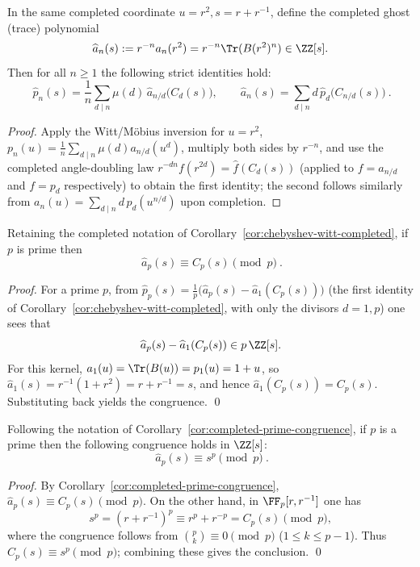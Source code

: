 \begin{corollary}\label{cor:chebyshev-witt-completed}
In the same completed coordinate \(u=r^2,s=r+r^{-1}\), define the completed ghost (trace) polynomial
\[
\widehat a_n(s):=r^{-n}a_n(r^2)=r^{-n}\Tr(B(r^2)^n)\in\ZZ[s].
\]
Then for all \(n\ge 1\) the following strict identities hold:
\[
\boxed{\
\widehat p_n(s)=\frac1n\sum_{d\mid n}\mu(d)\,\widehat a_{n/d}\!\bigl(C_d(s)\bigr),
\qquad
\widehat a_n(s)=\sum_{d\mid n}d\,\widehat p_d\!\bigl(C_{n/d}(s)\bigr)
\ }.
\]
\end{corollary}
\begin{proof}
Apply the Witt/M\"obius inversion for \(u=r^2\),
\(
p_n(u)=\frac1n\sum_{d\mid n}\mu(d)a_{n/d}(u^d)
\),
multiply both sides by \(r^{-n}\), and use the completed angle-doubling law
\(
r^{-dn}f(r^{2d})=\widehat f(C_d(s))
\)
(applied to \(f=a_{n/d}\) and \(f=p_d\) respectively) to obtain the first identity; the second follows similarly from
\(
a_n(u)=\sum_{d\mid n} d\,p_d(u^{n/d})
\)
upon completion.
\end{proof}

\begin{corollary}\label{cor:completed-prime-congruence}
Retaining the completed notation of Corollary~\ref{cor:chebyshev-witt-completed}, if \(p\) is prime then
\[
\boxed{\ \widehat a_p(s)\equiv C_p(s)\pmod p\ }.
\]
\end{corollary}
\begin{proof}
For a prime \(p\), from \(\widehat p_p(s)=\frac1p\bigl(\widehat a_p(s)-\widehat a_1(C_p(s))\bigr)\) (the first identity of Corollary~\ref{cor:chebyshev-witt-completed}, with only the divisors \(d=1,p\)) one sees that
\[
\widehat a_p(s)-\widehat a_1(C_p(s))\in p\,\ZZ[s].
\]
For this kernel, \(a_1(u)=\Tr(B(u))=p_1(u)=1+u\), so
\(
\widehat a_1(s)=r^{-1}(1+r^2)=r+r^{-1}=s
\), and hence \(\widehat a_1(C_p(s))=C_p(s)\).
Substituting back yields the congruence. \qed
\end{proof}

\begin{corollary}\label{cor:completed-teichmueller-congruence}
Following the notation of Corollary~\ref{cor:completed-prime-congruence}, if \(p\) is a prime then the following congruence holds in \(\ZZ[s]\):
\[
\boxed{\ \widehat a_p(s)\equiv s^p\pmod p\ }.
\]
\end{corollary}
\begin{proof}
By Corollary~\ref{cor:completed-prime-congruence}, \(\widehat a_p(s)\equiv C_p(s)\pmod p\).
On the other hand, in \(\FF_p[r,r^{-1}]\) one has
\[
s^p=(r+r^{-1})^p\equiv r^p+r^{-p}=C_p(s)\pmod p,
\]
where the congruence follows from \(\binom{p}{k}\equiv 0\pmod p\) (\(1\le k\le p-1\)).
Thus \(C_p(s)\equiv s^p\pmod p\); combining these gives the conclusion. \qed
\end{proof}

